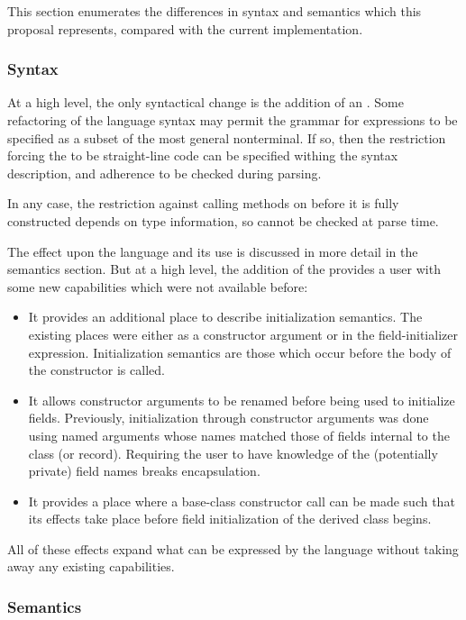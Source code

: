 This section enumerates the differences in syntax and semantics which this
proposal represents, compared with the current implementation.

\subsubsection{Syntax}

At a high level, the only syntactical change is the addition of
an .  Some refactoring of the language syntax may
permit the grammar for  expressions to be specified as
a subset of the most general  nonterminal.  If so, then the
restriction forcing the  to be straight-line code
can be specified withing the syntax description, and adherence to be checked
during parsing.

In any case, the restriction against calling methods on  before it is
fully constructed depends on type information, so cannot be checked at parse
time.

The effect upon the language and its use is discussed in more detail in the
semantics section.  But at a high level, the addition of
the  provides a user with some new capabilities
which were not available before:
\begin{itemize}
\item It provides an additional place to describe initialization semantics.  The
existing places were either as a constructor argument or in the
field-initializer expression.  Initialization semantics are those which occur
before the body of the constructor is called.
\item It allows constructor arguments to be renamed before being used to
initialize fields.  Previously, initialization
through constructor arguments was done using named arguments whose names matched
those of fields internal to the class (or record).  Requiring the user to have
knowledge of the (potentially private) field names breaks encapsulation.
\item It provides a place where a base-class constructor call can be made such
that its effects take place before field initialization of the derived class begins.
\end{itemize}
All of these effects expand what can be expressed by the language without taking
away any existing capabilities.

\subsubsection{Semantics}


